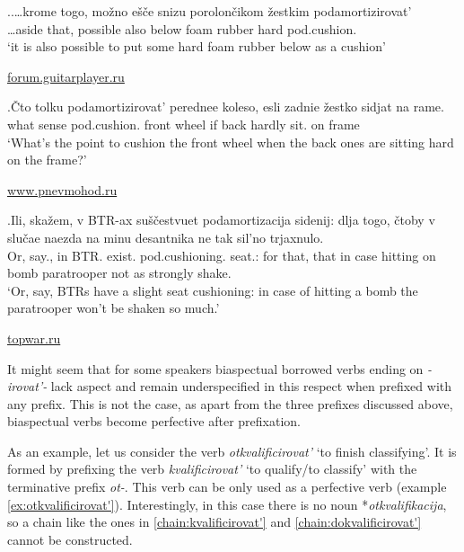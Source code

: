 \ex.\label{ex:cushion}\ag.\label{ex:cushion1}…krome togo, mo\v{z}no e\v{s}\v{c}e snizu porolon\v{c}ikom \v{z}estkim podamortizirovat'\textsuperscript{\PF}\\		
…aside that, possible also below {foam rubber} hard pod.cushion.\\
\trans `it is also possible to put some hard foam rubber below as a cushion'
\begin{flushright}
\vspace{-0.5em}
\url{forum.guitarplayer.ru}
\end{flushright}
\vspace{0.5em}\bg.\label{ex:cushion2}\v{C}to tolku podamortizirovat'\textsuperscript{\IPF} perednee koleso, esli zadnie \v{z}estko sidjat na rame.\\
what sense pod.cushion. front wheel if back hardly sit. on frame\\
\trans `What's the point to cushion the front wheel when the back ones are sitting hard on the frame?'
\begin{flushright}
\vspace{-0.5em}
\url{www.pnevmohod.ru}
\end{flushright}

\exg.\label{ex:podamortizacija}Ili, ska\v{z}em, v BTR-ax su\v{s}\v{c}estvuet podamortizacija sidenij: dlja togo, \v{c}toby v slu\v{c}ae naezda na minu desantnika ne tak sil'no trjaxnulo.\\
Or, say., in BTR. exist. pod.cushioning. seat.: for that, that in case hitting on bomb paratrooper not as strongly shake.\\
\trans `Or, say, BTRs have a slight seat cushioning: in case of hitting a bomb the paratrooper won't be shaken so much.'
\begin{flushright}
\vspace{-0.5em}
\url{topwar.ru}
\end{flushright}

It might seem that for some speakers biaspectual borrowed verbs ending on \textit{-irovat'-} lack aspect and remain underspecified in this respect when prefixed with any prefix. This is not the case, as apart from the three prefixes discussed above, biaspectual verbs become perfective after prefixation. 

As an example, let us consider the verb \textit{otkvalificirovat'} `to finish classifying'. It is formed by prefixing the verb \textit{kvalificirovat'} `to qualify/to classify' with the terminative prefix \textit{ot-}. This verb can be only used as a perfective verb (example \ref{ex:otkvalificirovat'}). Interestingly, in this case there is no noun *\textit{otkvalifikacija}, so a chain like the ones in \ref{chain:kvalificirovat'} and \ref{chain:dokvalificirovat'} cannot be constructed. 

